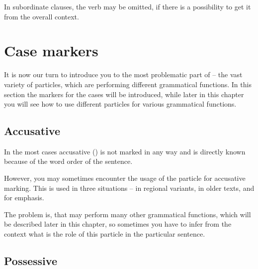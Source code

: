 
In subordinate clauses, the verb may be omitted, if there is a possibility to
get it from the overall context.

\section{Case markers}
\label{sec:cases}

It is now our turn to introduce you to the most problematic part of \andro --
the vast variety of particles, which are performing different grammatical
functions. In this section the markers for the cases will be introduced, while
later in this chapter you will see how to use different particles for various
grammatical functions.

\subsection{Accusative}

In the most cases accusative (\Acc{}) is not marked in any way and is directly
known because of the word order of the sentence.


However, you may sometimes encounter the usage of the  particle for
accusative marking. This is used in three situations -- in regional variants, in
older texts, and for emphasis.


The problem is, that  may perform many other grammatical functions,
which will be described later in this chapter, so sometimes you have to infer
from the context what is the role of this particle in the particular sentence.


\subsection{Possessive}

